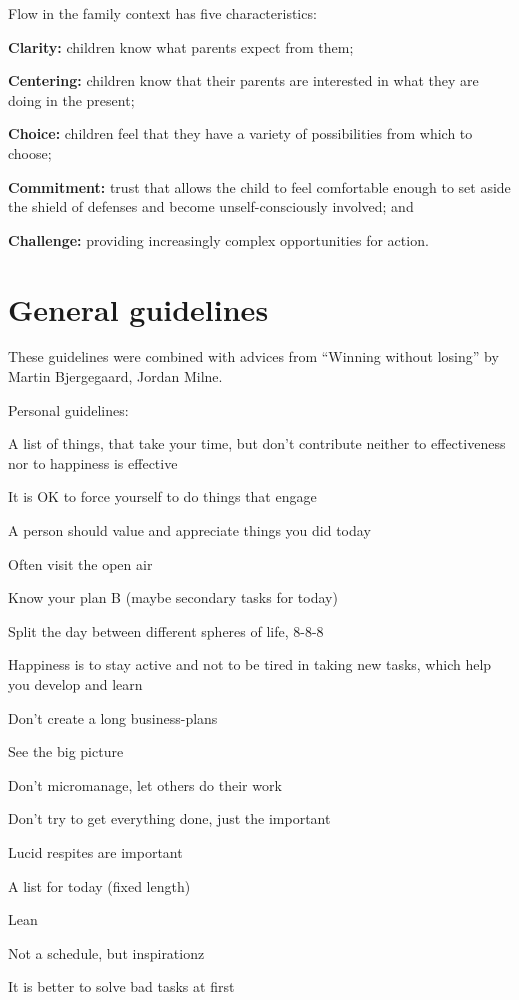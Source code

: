 Flow in the family context has five characteristics:
\begin{compactitem}
\item \textbf{Clarity:} children know what parents expect from them; 
\item \textbf{Centering:} children know that their parents are interested in what they are doing in the present;
\item \textbf{Choice:} children feel that they have a variety of possibilities from which to choose;
\item \textbf{Commitment:} trust that allows the child to feel comfortable enough to set aside the shield of defenses and become unself-consciously involved; and
\item \textbf{Challenge:} providing increasingly complex opportunities for action.
\end{compactitem}

\section{General guidelines}

These guidelines were combined with advices from ``Winning without losing'' by Martin Bjergegaard, Jordan Milne.

Personal guidelines:

\begin{compactenum}

\item A list of things, that take your time, but don't contribute neither to effectiveness nor to happiness is effective
\item It is OK to force yourself to do things that engage
\item A person should value and appreciate things you did today
\item Often visit the open air
\item Know your plan B (maybe secondary tasks for today)
\item Split the day between different spheres of life, 8-8-8
\item Happiness is to stay active and not to be tired in taking new tasks, which help you develop and learn
\item Don't create a long business-plans
\item See the big picture
\item Don't micromanage, let others do their work
\item Don't try to get everything done, just the important
\item Lucid respites are important
\item A list for today (fixed length)
\item Lean
\item Not a schedule, but inspirationz
\item It is better to solve bad tasks at first

\end{compactenum}

